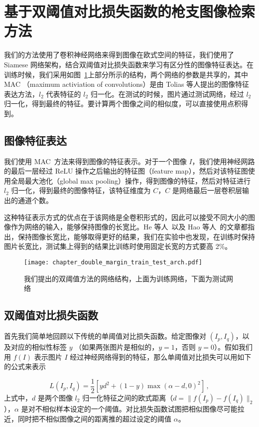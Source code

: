\section{基于双阈值对比损失函数的枪支图像检索方法}\label{sec:double_margin_method}
我们的方法使用了卷积神经网络来得到图像在欧式空间的特征，我们使用了 Siamese 网络架构，结合双阈值对比损失函数来学习有区分性的图像特征表达。在训练时候，我们采用如图~\ref{fig:train_test_arch}上部分所示的结构，两个网络的参数是共享的，其中 MAC （maximum activiation of convolutions）是由 Tolias 等人提出的图像特征表达方法，$l_2$ 代表特征的 $l_2$ 归一化。在测试的时候，图片通过测试网络，经过 $l_2$ 归一化，得到最终的特征。要计算两个图像之间的相似度，可以直接使用点积得到。

\subsection{图像特征表达}
我们使用 MAC~\cite{Tolias2015ParticularOR}方法来得到图像的特征表示。对于一个图像 $I$，我们使用神经网路的最后一层经过 ReLU 操作之后输出的特征图（feature map），然后对该特征图使用全局最大池化（global max pooling）操作，得到图像的特征，然后对特征进行 $l_2$ 归一化，得到最终的图像特征，该特征维度为 $C$，$C$ 是网络最后一层卷积层输出的通道个数。

这种特征表示方式的优点在于该网络是全卷积形式的，因此可以接受不同大小的图像作为网络的输入，能够保持图像的长宽比。He 等人~\cite{He2014SpatialPP}以及 Hao 等人~\cite{Hao2017MFCAM}的文章都指出，保持图像长宽比，能够取得更好的结果，我们在实验中也发现，在训练时保持图片长宽比，测试集上得到的结果比训练时使用固定长宽的方式要高 2\%。

\begin{figure}[t]
  \centering
  \texttt{[image: chapter\_double\_margin\_train\_test\_arch.pdf]}
  \caption{我们提出的双阈值方法的网络结构，上面为训练网络，下面为测试网络}
  \label{fig:train_test_arch}
\end{figure}

\subsection{双阈值对比损失函数}
首先我们简单地回顾以下传统的单阈值对比损失函数。给定图像对 $(I_p, I_q)$，以及对应的相似性标签 $y$ （如果两张图片是相似的，$y=1$，否则 $y=0$）。假如我们用 $f(I)$ 表示图片 $I$ 经过神经网络得到的特征，那么单阈值对比损失可以用如下的公式来表示

\begin{equation}\label{eq:single_margin_loss}
L(I_p, I_q) = \frac{1}{2}\left[yd^2 + (1-y)\max(\alpha - d, 0)^2\right]\, ,
\end{equation}
上式中，$d$ 是两个图像 $l_2$ 归一化特征之间的欧式距离（$d= \lVert f(I_p)-f(I_q)\rVert_2$），$\alpha$ 是对不相似样本设定的一个阈值。对比损失函数试图把相似图像尽可能拉近，同时把不相似图像之间的距离推的超过设定的阈值 $\alpha$。

